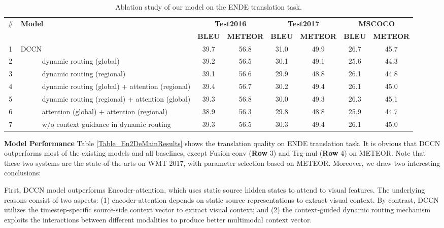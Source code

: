 \documentclass[sigconf]{acmart}
\begin{document}
\begin{table*}
\centering
\footnotesize
\begin{tabular}{c|l|cc|cc|cc}  
\hline
\multirow{2}{*}{\#} &\multirow{2}{*}{\bf Model} & \multicolumn{2}{|c|}{\textbf{Test2016}} & \multicolumn{2}{|c|}{\textbf{Test2017}} & \multicolumn{2}{c}{\textbf{MSCOCO}} \\ 
\cline{3-8}
& & \textbf{BLEU} & \textbf{METEOR} & \textbf{BLEU} & \textbf{METEOR}  & \textbf{BLEU} & \textbf{METEOR}\\
\hline
\hline
1 &DCCN & 39.7 & 56.8  & 31.0 & 49.9  & 26.7 & 45.7 \\
\hline
2 & \ \ \ \ \ \ dynamic routing (global)   & 39.2 & 56.5  & 30.1 & 49.1   & 25.6 & 44.3  \\
3 & \ \ \ \ \ \ dynamic routing (regional) & 39.1 & 56.6  & 29.9 & 48.8   & 26.1 & 44.8  \\
\hline
4 &\ \ \ \ \ \ dynamic routing (global) + attention (regional) & 39.4 & 56.7  & 30.2 & 49.4  & 26.1 & 45.0 \\
5 &\ \ \ \ \ \ dynamic routing (regional) + attention (global) & 39.3 & 56.8  & 30.0 & 49.3  & 26.3 & 45.1 \\
6 &\ \ \ \ \ \ attention (global) + attention (regional)       & 38.9 & 56.3  & 29.8 & 48.8  & 25.9 & 44.7 \\
\hline
7 &\ \ \ \ \ \ w/o context guidance in dynamic routing  & 39.3 & 56.5   & 30.3 & 49.4  & 26.1 & 45.0  \\
\hline
\end{tabular}
\caption{
\label{Table_ablation}
Ablation study of our model on the ENDE translation task. 
\vspace{-10pt}
}
\end{table*}


\textbf{Model Performance} Table \ref{Table_En2DeMainResults} shows the translation quality on  ENDE translation task. It is obvious that DCCN outperforms most of the existing models and all baselines, except Fusion-conv (\textbf{Row} 3) and Trg-mul (\textbf{Row} 4) on METEOR. Note that these two systems are the state-of-the-arts on WMT 2017, with parameter selection based on METEOR. Moreover, we draw two interesting conclusions:

First, DCCN model outperforms Encoder-attention, which uses static source hidden states to attend to visual features. The underlying reasons consist of two aspects: (1) encoder-attention depends on static source representations to extract visual context. By contrast, DCCN utilizes the timestep-specific source-side context vector to extract visual context; and (2) the context-guided dynamic routing mechanism exploits the interactions between different modalities to produce better multimodal context vector. 
\end{document}

